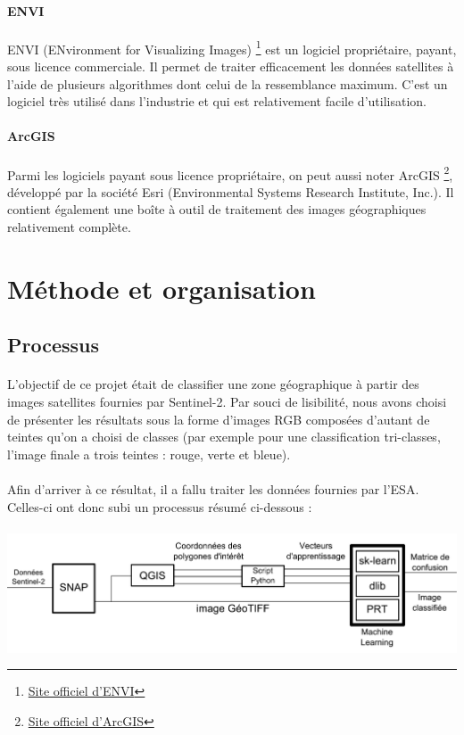 \documentclass[a4paper,10pt]{article}
\begin{document}
\paragraph{ENVI}
\paragraph{}
ENVI (ENvironment for Visualizing Images) \footnote{\href{http://www.exelisvis.fr/ProduitsetServices/LesproduitsENVI/ENVI.aspx}{Site officiel d'ENVI}} est un logiciel propriétaire, payant, sous licence commerciale. Il permet de traiter efficacement les données satellites à l'aide de plusieurs algorithmes dont celui de la ressemblance maximum. C'est un logiciel très utilisé dans l'industrie et qui est relativement facile d'utilisation.
\paragraph{ArcGIS}
\paragraph{}
Parmi les logiciels payant sous licence propriétaire, on peut aussi noter ArcGIS \footnote{\href{http://www.esrifrance.fr/arcgis.aspx}{Site officiel d'ArcGIS}}, développé par la société Esri (Environmental Systems Research Institute, Inc.). Il contient également une boîte à outil de traitement des images géographiques relativement complète.

\section{Méthode et organisation}
\subsection{Processus}
\paragraph{}
L'objectif de ce projet était de classifier une zone géographique à partir des images satellites fournies par Sentinel-2. Par souci de lisibilité, nous avons choisi de présenter les résultats sous la forme d'images RGB composées d'autant de teintes qu'on a choisi de classes (par exemple pour une classification tri-classes, l'image finale a trois teintes : rouge, verte et bleue).
\paragraph{}
Afin d'arriver à ce résultat, il a fallu traiter les données fournies par l'ESA. Celles-ci ont donc subi un processus résumé ci-dessous : \\\\
\includegraphics[scale=0.3]{process_Multispec.pdf}
\end{document}
